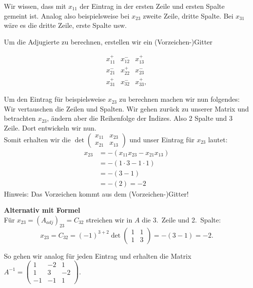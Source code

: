 \documentclass[a4paper,11pt,oneside,open=any,parskip=half, DIV=15]{scrreprt}
\begin{document}
      \vspace{1em}

      Wir wissen, dass mit \( x_{11} \) der Eintrag in der ersten Zeile und ersten Spalte gemeint ist. Analog also beispielsweise bei \( x_{23} \) zweite Zeile, dritte Spalte. Bei \( x_{31} \) wäre es die dritte Zeile, erste Spalte usw.

      Um die Adjugierte zu berechnen, erstellen wir ein (Vorzeichen-)Gitter

      \[
            \begin{matrix} 
                        x_{11}^{+} & x_{12}^{-} & x_{13}^{+} \\ 
                        x_{21}^{-} & x_{22}^{+} & x_{23}^{-} \\ 
                        x_{31}^{+} & x_{32}^{-} & x_{33}^{+}, 
            \end{matrix} 
      \]

      Um den Eintrag für beispielsweise \( x_{23} \) zu berechnen machen wir nun folgendes: Wir vertauschen die Zeilen und Spalten. Wir gehen zurück zu unserer Matrix und betrachten \( x_{23} \), ändern aber die Reihenfolge der Indizes. Also 2 Spalte und 3 Zeile. Dort entwickeln wir nun.\\
      Somit erhalten wir die \( \det \begin{pmatrix} x_{11} & x_{23} \\ x_{21} & x_{13} \end{pmatrix} \) und unser Eintrag für \( x_{23} \) lautet: 
      \begin{align*}
            x_{23} 
               &= - ( x_{11}x_{23} - x_{21} x_{13} )\\
               &= - (1 \cdot 3 - 1 \cdot 1 )\\
               &= - (3 - 1 )\\
               &= - (2) = -2
      \end{align*}
      Hinweis: Das Vorzeichen kommt aus dem (Vorzeichen-)Gitter!

      \textbf{Alternativ mit Formel}\\
      Für \(x_{23}= (A_{adj})_{23}=C_{32}\) streichen wir in \(A\) die 3.~Zeile und 2.~Spalte:
      \[
         x_{23}=C_{32}=(-1)^{3+2}\det\begin{pmatrix}1&1\\[2pt]1&3\end{pmatrix}
         =-(3-1)=-2.
      \]

      So gehen wir analog für jeden Eintrag und erhalten die Matrix \( A^{-1} = \begin{pmatrix} 1 & - 2 & 1\\ 1 & 3 & -2\\ - 1 & - 1 & 1 \end{pmatrix}\).
\end{document}

